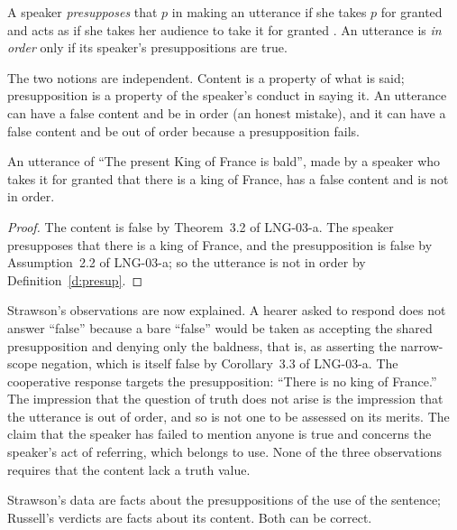 \documentclass{situationist-preprint}
\begin{document}
\begin{definition}\label{d:presup}
A speaker \emph{presupposes} that $p$ in making an utterance if she takes $p$ for granted and acts as if she takes her audience to take it for granted \citep{Stalnaker1974}. An utterance is \emph{in order} only if its speaker's presuppositions are true.
\end{definition}

The two notions are independent. Content is a property of what is said; presupposition is a property of the speaker's conduct in saying it. An utterance can have a false content and be in order (an honest mistake), and it can have a false content and be out of order because a presupposition fails.

\begin{proposition}\label{p:use}
An utterance of \enquote{The present King of France is bald}, made by a speaker who takes it for granted that there is a king of France, has a false content and is not in order.
\end{proposition}

\begin{proof}
The content is false by Theorem~3.2 of LNG-03-a. The speaker presupposes that there is a king of France, and the presupposition is false by Assumption~2.2 of LNG-03-a; so the utterance is not in order by Definition~\ref{d:presup}.
\end{proof}

Strawson's observations are now explained. A hearer asked to respond does not answer \enquote{false} because a bare \enquote{false} would be taken as accepting the shared presupposition and denying only the baldness, that is, as asserting the narrow-scope negation, which is itself false by Corollary~3.3 of LNG-03-a. The cooperative response targets the presupposition: \enquote{There is no king of France.} The impression that the question of truth does not arise is the impression that the utterance is out of order, and so is not one to be assessed on its merits. The claim that the speaker has failed to mention anyone is true and concerns the speaker's act of referring, which belongs to use. None of the three observations requires that the content lack a truth value.

\begin{corollary}\label{c:division}
Strawson's data are facts about the presuppositions of the use of the sentence; Russell's verdicts are facts about its content. Both can be correct.
\end{corollary}
\end{document}
